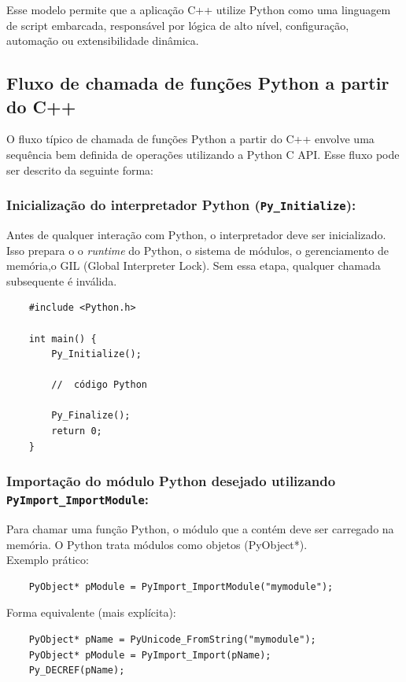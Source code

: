     

Esse modelo permite que a aplicação C++ utilize Python como uma linguagem de script embarcada, responsável por lógica de alto nível, configuração, automação ou extensibilidade dinâmica.

\subsection{Fluxo de chamada de funções Python a partir do C++}

O fluxo típico de chamada de funções Python a partir do C++ envolve uma sequência bem definida de operações utilizando a Python C API. Esse fluxo pode ser descrito da seguinte forma:

   \subsubsection{ Inicialização do interpretador Python (\texttt{Py\_Initialize}):}
    Antes de qualquer interação com Python, o interpretador deve ser inicializado.
Isso prepara o o \emph{runtime} do Python, o sistema de módulos, o gerenciamento de memória,o GIL (Global Interpreter Lock).  Sem essa etapa, qualquer chamada subsequente é inválida.
\begin{verbatim}
    #include <Python.h>

    int main() {
        Py_Initialize();
    
        //  código Python
    
        Py_Finalize();
        return 0;
    }
\end{verbatim} 
   
    \subsubsection{ Importação do módulo Python desejado utilizando  \texttt{PyImport\_ImportModule}:}
    Para chamar uma função Python, o módulo que a contém deve ser carregado na memória.
O Python trata módulos como objetos (PyObject*).\\
Exemplo prático:
\begin{verbatim}
    PyObject* pModule = PyImport_ImportModule("mymodule");
\end{verbatim} 
Forma equivalente (mais explícita):
\begin{verbatim}
    PyObject* pName = PyUnicode_FromString("mymodule");
    PyObject* pModule = PyImport_Import(pName);
    Py_DECREF(pName);
\end{verbatim} 

